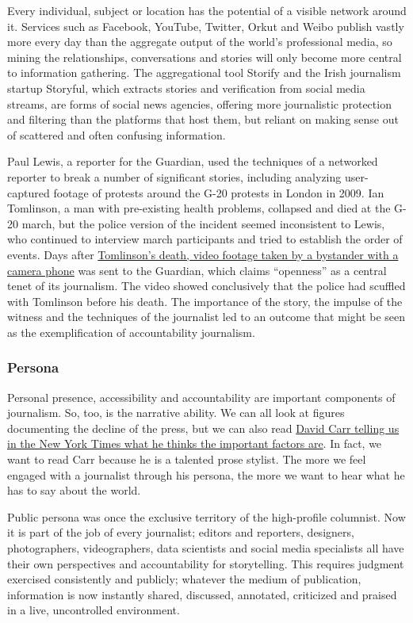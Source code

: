Every individual, subject or location has the potential of a visible network around
it. Services such as Facebook, YouTube, Twitter, Orkut and Weibo publish vastly
more every day than the aggregate output of the world’s professional media, so
mining the relationships, conversations and stories will only become more central
to information gathering. The aggregational tool Storify and the Irish journalism
startup Storyful, which extracts stories and verification from social media streams,
are forms of social news agencies, offering more journalistic protection and filtering
than the platforms that host them, but reliant on making sense out of scattered
and often confusing information.

Paul Lewis, a reporter for the Guardian, used the techniques of a networked
reporter to break a number of significant stories, including analyzing user-captured
footage of protests around the G-20 protests in London in 2009. Ian Tomlinson,
a man with pre-existing health problems, collapsed and died at the G-20
march, but the police version of the incident seemed inconsistent to Lewis, who
continued to interview march participants and tried to establish the order of
events. Days after \href{http://www.guardian.co.uk/uk/video/2012/jul/19/simon-harwood-ian-tomlinson-video}{Tomlinson’s death, video footage taken by a bystander with a
camera phone} was sent to the Guardian, which claims ``openness'' as a central
tenet of its journalism. The video showed conclusively that the police had scuffled
with Tomlinson before his death. The importance of the story, the impulse of
the witness and the techniques of the journalist led to an outcome that might be
seen as the exemplification of accountability journalism.

\subsubsection{Persona}
Personal presence, accessibility and accountability are important components of
journalism. So, too, is the narrative ability. We can all look at figures documenting
the decline of the press, but we can also read \href{http://topics.nytimes.com/top/news/business/columns/media_equation/index.html}{David Carr telling us in the
New York Times what he thinks the important factors are}. In fact, we want to
read Carr because he is a talented prose stylist. The more we feel engaged with
a journalist through his persona, the more we want to hear what he has to say
about the world.

Public persona was once the exclusive territory of the high-profile columnist.
Now it is part of the job of every journalist; editors and reporters, designers,
photographers, videographers, data scientists and social media specialists all have
their own perspectives and accountability for storytelling. This requires judgment
exercised consistently and publicly; whatever the medium of publication, information
is now instantly shared, discussed, annotated, criticized and praised in a
live, uncontrolled environment.


